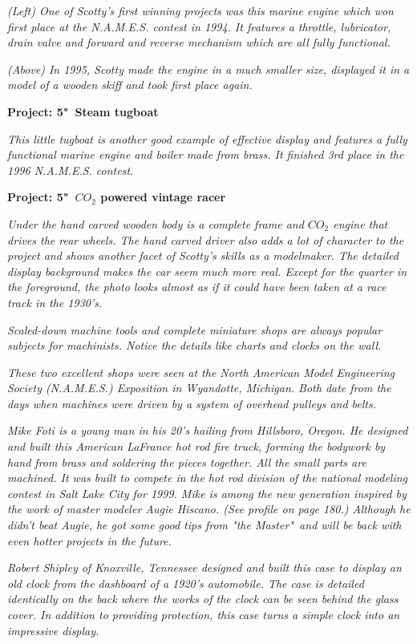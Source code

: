 \bigskip
\textit{(Left) One of Scotty's first winning projects was this marine engine
which won first place at the N.A.M.E.S. contest in 1994. It features a throttle,
lubricator, drain valve and forward and reverse mechanism which are all fully
functional.}

\bigskip\textit{(Above) In 1995, Scotty made the engine in a much smaller size,
displayed it in a model of a wooden skiff and took first place again.}

\bigskip
\textbf{Project: 5"\ Steam tugboat}

\bigskip\textit{This little tugboat is another good example of effective display
and features a fully functional marine engine and boiler made from brass. It
finished 3rd place in the 1996 N.A.M.E.S. contest.}

\bigskip
\textbf{Project: 5"\ $CO_{2}$ powered vintage racer}

\bigskip\textit{Under the hand carved wooden body is a complete frame and
$CO_{2}$ engine that drives the rear wheels. The hand carved driver also adds a
lot of character to the project and shows another facet of Scotty's skills as a
modelmaker. The detailed display background makes the car seem much more real.
Except for the quarter in the foreground, the photo looks almost as if it could
have been taken at a race track in the 1930's.}

\bigskip\textit{Scaled-down machine tools and complete miniature shops are
always popular subjects for machinists. Notice the details like charts and
clocks on the wall.}

\bigskip\textit{These two excellent shops were seen at the North American Model
Engineering Society (N.A.M.E.S.) Exposition in Wyandotte, Michigan. Both date
from the days when machines were driven by a system of overhead pulleys and
belts.}

\bigskip\textit{Mike Foti  is  a young man in his 20's hailing from Hillsboro,
Oregon. He designed and built this American LaFrance hot rod fire truck, forming
the bodywork by hand from brass and soldering the pieces together.
All the small parts are machined. It was built to compete in the hot rod
division of the national modeling contest in Salt Lake City for 1999. Mike is
among the new generation inspired by the work of master modeler Augie Hiscano.
(See profile on page 180.) Although he didn't beat Augie, he got some good tips
from "the Master"\ and will be back with even hotter projects in the future.}

\bigskip\textit{Robert Shipley of Knoxville, Tennessee designed and built this
case to display an old clock from the dashboard of a 1920's automobile. The case
is detailed identically on the back where the works of the clock can be seen
behind the glass cover. In addition to providing protection, this case turns a
simple clock into an impressive display.}
